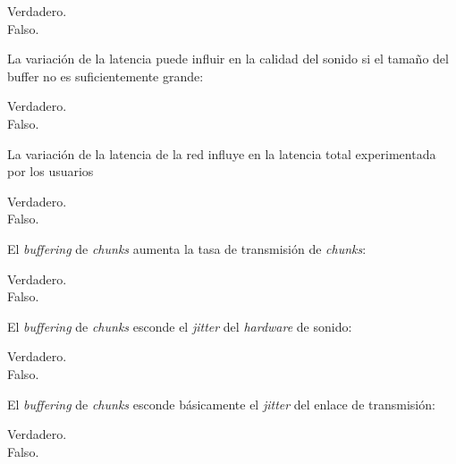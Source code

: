 \documentclass[legalpaper, 12pt, addpoints]{exam}
\begin{document}
\begin{questions}
\begin{oneparchoices}
  \choice Verdadero.\\
  \choice Falso.
\end{oneparchoices}
  
\vspace{0.10in}

\question La variación de la latencia puede influir en la calidad del
sonido si el tamaño del buffer no es suficientemente grande:

\begin{oneparchoices}
  \choice Verdadero.\\
  \choice Falso.
\end{oneparchoices}
  
\vspace{0.10in}

\question La variación de la latencia de la red influye en la latencia
total experimentada por los usuarios

\begin{oneparchoices}
  \choice Verdadero.\\
  \choice Falso.
\end{oneparchoices}
  
\vspace{0.10in}

\question El \emph{buffering} de \emph{chunks} aumenta la tasa de transmisión
de \emph{chunks}:

\begin{oneparchoices}
  \choice Verdadero.\\
  \choice Falso.
\end{oneparchoices}
  
\vspace{0.10in}

\question El \emph{buffering} de \emph{chunks} esconde el
\emph{jitter} del \emph{hardware} de sonido:

\begin{oneparchoices}
  \choice Verdadero.\\
  \choice Falso.
\end{oneparchoices}
  
\vspace{0.10in}

\question El \emph{buffering} de \emph{chunks} esconde básicamente el
\emph{jitter} del enlace de transmisión:

\begin{oneparchoices}
  \choice Verdadero.\\
  \choice Falso.
\end{oneparchoices}
  

\end{questions}
\end{document}
